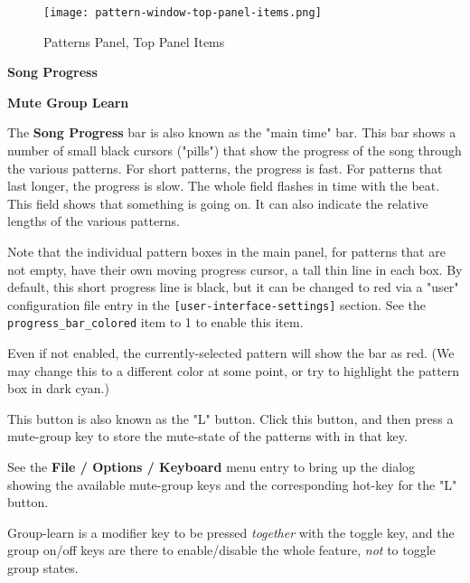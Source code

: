 \begin{figure}[H]
   \centering 
   \texttt{[image: pattern-window-top-panel-items.png]}
   \caption{Patterns Panel, Top Panel Items}
   \label{fig:pattern_window_top_panel_items}
\end{figure}

   \begin{enumber}
      \item \textbf{Song Progress}
      \item \textbf{Mute Group Learn}
   \end{enumber}

   \setcounter{ItemCounter}{0}      %

   The \textbf{Song Progress} bar is also known as the "main time" bar.
   This bar shows a number of small black cursors ("pills") that show the
   progress of the song through the various patterns.  For short patterns,
   the progress is fast.  For patterns that last longer, the progress is
   slow.  The whole field flashes in time with the beat.
   This field shows that something is going on.  It can also indicate
   the relative lengths of the various patterns.
 
   Note that the individual pattern boxes in the main panel, for
   patterns that are not empty, have their own
   moving progress cursor, a tall thin line in each box.
   By default, this short progress line is black, but it can be changed to
   red via a "user" configuration file entry in the 
   \texttt{[user-interface-settings]} section.
   See the \texttt{progress\_bar\_colored} item to 1 to enable this item.

   Even if not enabled, the currently-selected pattern will show the bar as
   red.  (We may change this to a different color at some point, or try to
   highlight the pattern box in dark cyan.)

   This button is also known as the "L" button.
   Click this button, and then press a mute-group key
   to store the mute-state of the patterns with in that key.

   See the \textbf{File / Options / Keyboard} menu entry to bring up the
   dialog showing the available mute-group keys and the corresponding
   hot-key for the "L" button.

   Group-learn is a modifier key to be pressed \textsl{together}
   with the toggle key, and the group on/off keys are there to enable/disable
   the whole feature, \textsl{not} to toggle group states.

